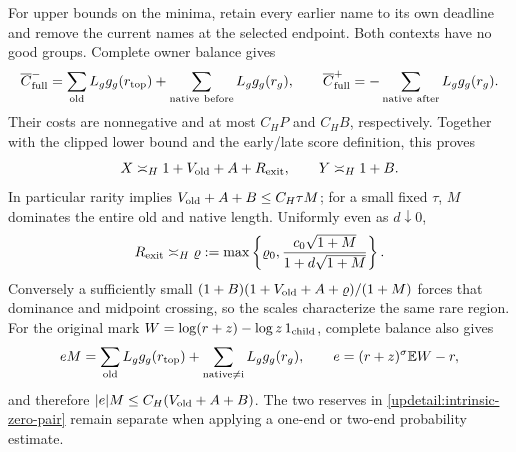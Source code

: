 For upper bounds on the minima, retain every earlier name to its own
deadline and remove the current names at the selected endpoint. Both
contexts have no good groups. Complete owner balance gives
\[
 \overline C^-_{\rm full}
 =\sum_{\rm old}L_gg_g(r_{\rm top})+
   \sum_{\rm native\ before}L_gg_g(r_g),\qquad
 \overline C^+_{\rm full}
 =-\sum_{\rm native\ after}L_gg_g(r_g).
\]
Their costs are nonnegative and at most $C_HP$ and $C_HB$,
respectively. Together with the clipped lower bound and the early/late
score definition, this proves
\begin{equation}
 X\asymp_H1+V_{\rm old}+A+R_{\rm exit},\qquad
 Y\asymp_H1+B.
 \label{updetail:intrinsic-zero-pair}
\end{equation}
In particular rarity implies $V_{\rm old}+A+B\leq C_H\tau M$;
for a small fixed $\tau$, $M$ dominates the entire old and native
length. Uniformly even as $d\downarrow0$,
\[
 R_{\rm exit}\asymp_H
 \varrho:=\max\left\{\varrho_0,
 \frac{c_0\sqrt{1+M}}{1+d\sqrt{1+M}}\right\}.
\]
Conversely a sufficiently small
$(1+B)(1+V_{\rm old}+A+\varrho)/(1+M)$ forces that dominance and
midpoint crossing, so the scales characterize the same rare region.
For the original mark
$W=\log(r+z)-\log z\,1_{\rm child}$, complete balance also gives
\[
 eM=\sum_{\rm old}L_gg_g(r_{\rm top})+
     \sum_{\rm native\ne i}L_gg_g(r_g),
 \qquad e=(r+z)^\sigma\mathbb EW-r,
\]
and therefore $|e|M\leq C_H(V_{\rm old}+A+B)$.
The two reserves in \eqref{updetail:intrinsic-zero-pair} remain
separate when applying a one-end or two-end probability estimate.

